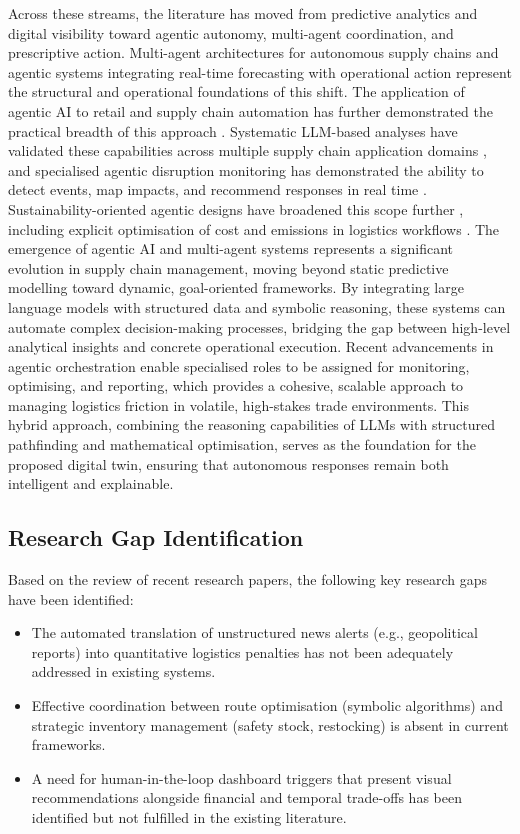 Across these streams, the literature has moved from predictive analytics and digital visibility toward agentic autonomy, multi-agent coordination, and prescriptive action. Multi-agent architectures for autonomous supply chains \cite{XuEtAl2024} and agentic systems integrating real-time forecasting with operational action \cite{Tiwari2025} represent the structural and operational foundations of this shift. The application of agentic AI to retail and supply chain automation has further demonstrated the practical breadth of this approach \cite{Kalisetty2024}. Systematic LLM-based analyses have validated these capabilities across multiple supply chain application domains \cite{QuHuIvanov2026}, and specialised agentic disruption monitoring has demonstrated the ability to detect events, map impacts, and recommend responses in real time \cite{AlMahriEtAl2026}. Sustainability-oriented agentic designs have broadened this scope further \cite{Tathavadekar2025}, including explicit optimisation of cost and emissions in logistics workflows \cite{Aylak2025}. 
The emergence of agentic AI and multi-agent systems represents a significant evolution in supply chain management, moving beyond static predictive modelling toward dynamic, goal-oriented frameworks. By integrating large language models with structured data and symbolic reasoning, these systems can automate complex decision-making processes, bridging the gap between high-level analytical insights and concrete operational execution. Recent advancements in agentic orchestration enable specialised roles to be assigned for monitoring, optimising, and reporting, which provides a cohesive, scalable approach to managing logistics friction in volatile, high-stakes trade environments. This hybrid approach, combining the reasoning capabilities of LLMs with structured pathfinding and mathematical optimisation, serves as the foundation for the proposed digital twin, ensuring that autonomous responses remain both intelligent and explainable.

\subsection[Research Gap Identification]{\textbf{Research Gap Identification}}

Based on the review of recent research papers, the following key research gaps have been identified:
\begin{itemize}
    \item The automated translation of unstructured news alerts (e.g., geopolitical reports) into quantitative logistics penalties has not been adequately addressed in existing systems.
    \item Effective coordination between route optimisation (symbolic algorithms) and strategic inventory management (safety stock, restocking) is absent in current frameworks.
    \item A need for human-in-the-loop dashboard triggers that present visual recommendations alongside financial and temporal trade-offs has been identified but not fulfilled in the existing literature.
\end{itemize}

